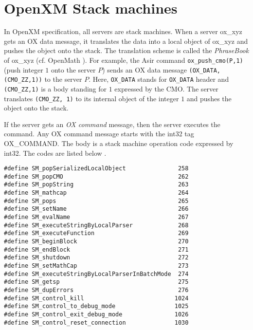 
\section{OpenXM Stack machines}\label{sec:ox-stackmachines}

In OpenXM specification, all servers are stack machines.
When a server ox\_xyz gets an OX data message,
it translates the data into a local object of ox\_xyz
and pushes the object onto the stack.
The translation scheme 
is called the {\it PhraseBook} of ox\_xyz (cf. OpenMath \cite{OpenMath}).
For example, the Asir command {\tt ox\_push\_cmo(P,1)}
(push integer $1$ onto the server $P$)
sends an OX data message
{\tt (OX\_DATA,(CMO\_ZZ,1))} to the server $P$.
Here,
{\tt OX\_DATA} stands for {\tt OX\_DATA} header and 
{\tt (CMO\_ZZ,1)} is a body standing for $1$ expressed 
by the CMO.
The server translates {\tt (CMO\_ZZ, 1)} to its internal object of
the integer  $1$
and pushes the object onto the stack.

If the server gets an {\it OX command} message, then the server 
executes the command.
Any OX command message starts with the int32 tag OX\_COMMAND.
The body is a stack machine operation code expressed by int32.
The codes are listed below \cite{ox-rfc-100}.
\begin{verbatim}
#define SM_popSerializedLocalObject               258
#define SM_popCMO                                 262
#define SM_popString                              263
#define SM_mathcap                                264
#define SM_pops                                   265
#define SM_setName                                266
#define SM_evalName                               267
#define SM_executeStringByLocalParser             268
#define SM_executeFunction                        269
#define SM_beginBlock                             270
#define SM_endBlock                               271
#define SM_shutdown                               272
#define SM_setMathCap                             273
#define SM_executeStringByLocalParserInBatchMode  274
#define SM_getsp                                  275
#define SM_dupErrors                              276
#define SM_control_kill                          1024
#define SM_control_to_debug_mode                 1025
#define SM_control_exit_debug_mode               1026
#define SM_control_reset_connection              1030
\end{verbatim}

